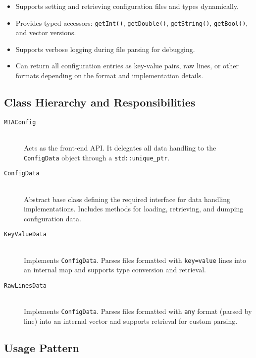 \begin{itemize}\itemsep0em
	\item Supports setting and retrieving configuration files and types dynamically.
	\item Provides typed accessors: \texttt{getInt()}, \texttt{getDouble()}, \texttt{getString()}, \texttt{getBool()}, and vector versions.
	\item Supports verbose logging during file parsing for debugging.
	\item Can return all configuration entries as key-value pairs, raw lines, or other formats depending on the format and implementation details.
\end{itemize}

\subsection{Class Hierarchy and Responsibilities}

\begin{description}
	\item[\texttt{MIAConfig}] 
	\hfill \\
	Acts as the front-end API. It delegates all data handling to the \texttt{ConfigData} object through a \texttt{std::unique\_ptr}.
	
	\item[\texttt{ConfigData}] 
	\hfill \\
	Abstract base class defining the required interface for data handling implementations. Includes methods for loading, retrieving, and dumping configuration data.
	
	\item[\texttt{KeyValueData}]
	\hfill \\
	Implements \texttt{ConfigData}. Parses files formatted with \texttt{key=value} lines into an internal map and supports type conversion and retrieval.
	
	\item[\texttt{RawLinesData}]
	\hfill \\
	Implements \texttt{ConfigData}. Parses files formatted with \texttt{any} format (parsed by line) into an internal vector and supports retrieval for custom parsing.
\end{description}

\subsection{Usage Pattern}

